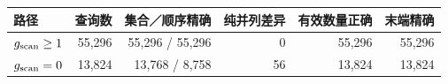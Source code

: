 \begin{tabular}{@{}lrrrrr@{}}
\toprule
路径 & 查询数 & 集合／顺序精确 & 纯并列差异 & 有效数量正确 & 末端精确 \\
\midrule
$g_{\mathrm{scan}}\geq1$ & 55,296 & 55,296 / 55,296 & 0 & 55,296 & 55,296 \\
$g_{\mathrm{scan}}=0$ & 13,824 & 13,768 / 8,758 & 56 & 13,824 & 13,824 \\
\bottomrule
\end{tabular}
